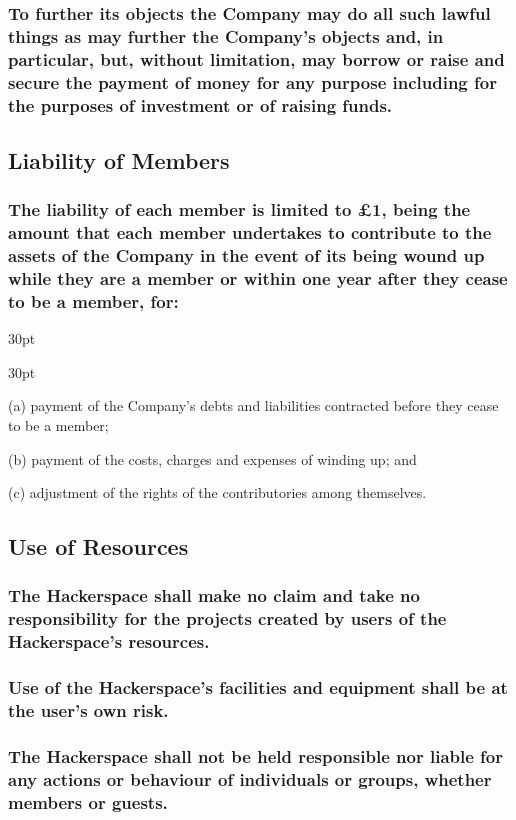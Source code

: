 \documentclass[12pt]{article}
\def\clauseindent{30pt}
\newenvironment{subindentlist}{\begin{adjustwidth}{\clauseindent}{}\begin{labeledlist}{\clauseindent}}{\end{labeledlist}\end{adjustwidth}}
\begin{document}
\subsubsection{To further its objects the Company may do all such lawful things as may further the Company's objects and, in particular, but, without limitation, may borrow or raise and secure the payment of money for any purpose including for the purposes of investment or of raising funds.}

\subsection{Liability of Members}
\subsubsection{The liability of each member is limited to £1, being the amount that each member undertakes to contribute to the assets of the Company in the event of its being wound up while they are a member or within one year after they cease to be a member, for:}
\begin{subindentlist}
  \item [(a)] payment of the Company's debts and liabilities contracted before they cease to be a member;
  \item [(b)] payment of the costs, charges and expenses of winding up; and
  \item [(c)] adjustment of the rights of the contributories among themselves.
\end{subindentlist}

\subsection{Use of Resources}
\subsubsection{The Hackerspace shall make no claim and take no responsibility for the projects created by users of the Hackerspace's resources.}
\subsubsection{Use of the Hackerspace's facilities and equipment shall be at the user's own risk.}
\subsubsection{The Hackerspace shall not be held responsible nor liable for any actions or behaviour of individuals or groups, whether members or guests.}
\end{document}
